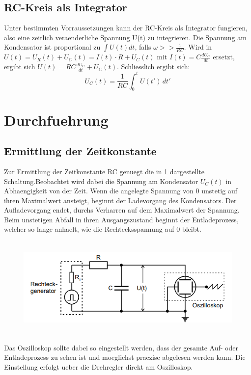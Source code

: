 \subsection{RC-Kreis als Integrator}
Unter bestimmten Vorraussetzungen kann der RC-Kreis als Integrator fungieren, also eine zeitlich veraenderliche Spannung U(t) zu integrieren. Die Spannung am Kondensator ist proportional zu $\int U(t)dt$, falls $\omega>>\frac{1}{RC}$. Wird in $U(t)=U_R(t)+U_C(t)=I(t)\cdot R+U_C(t)$ mit $I(t)=C\frac{dU_C}{dt}$ ersetzt, ergibt sich $U(t)=RC\frac{dU_C}{dt}+U_C(t)$. Schliesslich ergibt sich:
\begin{equation}
    U_C(t)=\frac{1}{RC}\int_{0}^{t} U(t') \,dt'
\end{equation}
\section{Durchfuehrung}
\subsection{Ermittlung der Zeitkonstante}
Zur Ermittlung der Zeitkonstante RC genuegt die in \ref{Fig:Zeitk} dargestellte Schaltung.Beobachtet wird dabei die Spannung am Kondensator $U_C(t)$ in Abhaengigkeit von der Zeit. Wenn die angelegte Spannung von 0 unstetig auf ihren Maximalwert ansteigt, beginnt der Ladevorgang des Kondensators. Der Aufladevorgang endet, durchs Verharren auf dem Maximalwert der Spannung. Beim unstetigen Abfall in ihren Ausgangszustand beginnt der Entladeprozess, welcher so lange anhaelt, wie die Rechtecksspannung auf 0 bleibt.
\begin{figure}[H]
    \centering
    \captionsetup{justification=centering}
    \includegraphics[height=5cm]{"Zeit_RCKreis.png"}
    \label{Fig:Zeitk}
\end{figure}
Das Oszilloskop sollte dabei so eingestellt werden, dass der gesamte Auf- oder Entladeprozess zu sehen ist und moeglichst praezise abgelesen werden kann. Die Einstellung erfolgt ueber die Drehregler direkt am Oszilloskop.
